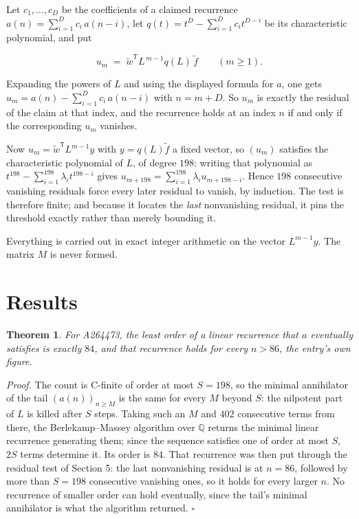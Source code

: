 \documentclass[11pt]{article}
\newtheorem{theorem}{Theorem}
\theoremstyle{definition}
\begin{document}
Let $c_1,\dots,c_D$ be the coefficients of a claimed recurrence $a(n) = \sum_{i=1}^{D} c_i\,a(n-i)$, let $q(t) = t^{D} - \sum_{i=1}^{D} c_i t^{D-i}$ be its characteristic polynomial, and put

\[u_m \;=\; \tilde w^{\mathsf T} L^{\,m-1} q(L)\,\tilde f \qquad (m \ge 1).\]

Expanding the powers of $L$ and using the displayed formula for $a$, one gets $u_m = a(n) - \sum_{i=1}^{D} c_i\,a(n-i)$ with $n = m + D$. So $u_m$ is exactly the residual of the claim at that index, and the recurrence holds at an index $n$ if and only if the corresponding $u_m$ vanishes.

Now $u_m = \tilde w^{\mathsf T} L^{m-1} y$ with $y = q(L)\tilde f$ a fixed vector, so $(u_m)$ satisfies the characteristic polynomial of $L$, of degree $198$: writing that polynomial as $t^{198} - \sum_{i=1}^{198} \lambda_i t^{198-i}$ gives $u_{m+198} = \sum_{i=1}^{198} \lambda_i u_{m+198-i}$. Hence $198$ consecutive vanishing residuals force every later residual to vanish, by induction. The test is therefore finite; and because it locates the {\itshape last} nonvanishing residual, it pins the threshold exactly rather than merely bounding it.

Everything is carried out in exact integer arithmetic on the vector $L^{m-1}y$. The matrix $M$ is never formed.

\section{Results}

\begin{theorem} For A264473, the least order of a linear recurrence that $a$ eventually satisfies is exactly $84$, and that recurrence holds for every $n > 86$, the entry's own figure.\end{theorem}

{\itshape Proof.} The count is C-finite of order at most $S = 198$, so the minimal annihilator of the tail $(a(n))_{n \ge M}$ is the same for every $M$ beyond $S$: the nilpotent part of $L$ is killed after $S$ steps. Taking such an $M$ and $402$ consecutive terms from there, the Berlekamp--Massey algorithm over $\mathbb{Q}$ returns the minimal linear recurrence generating them; since the sequence satisfies one of order at most $S$, $2S$ terms determine it. Its order is $84$. That recurrence was then put through the residual test of Section 5: the last nonvanishing residual is at $n = 86$, followed by more than $S = 198$ consecutive vanishing ones, so it holds for every larger $n$. No recurrence of smaller order can hold eventually, since the tail's minimal annihilator is what the algorithm returned. $\square$
\end{document}
